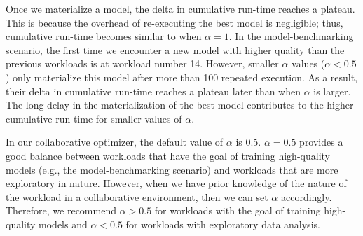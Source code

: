Once we materialize a model, the delta in cumulative run-time reaches a plateau.
This is because the overhead of re-executing the best model is negligible; thus, cumulative run-time becomes similar to when $\alpha=1$.
In the model-benchmarking scenario, the first time we encounter a new model with higher quality than the previous workloads is at workload number 14.
However, smaller $\alpha$ values ($\alpha<0.5$) only materialize this model after more than 100 repeated execution.
As a result, their delta in cumulative run-time reaches a plateau later than when $\alpha$ is larger.
The long delay in the materialization of the best model contributes to the higher cumulative run-time for smaller values of $\alpha$.

In our collaborative optimizer, the default value of $\alpha$ is 0.5. 
$\alpha =0.5$ provides a good balance between workloads that have the goal of training high-quality models (e.g., the model-benchmarking scenario) and workloads that are more exploratory in nature.
However, when we have prior knowledge of the nature of the workload in a collaborative environment, then we can set $\alpha$ accordingly.
Therefore, we recommend $\alpha>0.5$ for workloads with the goal of training high-quality models and $\alpha<0.5$ for workloads with exploratory data analysis.

